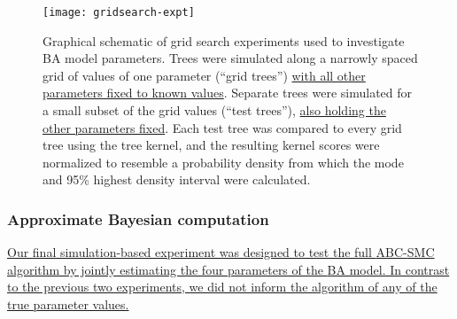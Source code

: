 
\begin{figure}[ht]
  \centering
  \texttt{[image: gridsearch-expt]}
  \caption[Schematic of grid search experiment.]{
    Graphical schematic of grid search experiments used to investigate \gls{BA}
    model parameters. Trees were simulated along a narrowly spaced grid of
    values of one parameter (``grid trees'') {\color{blue}\uline{with all other
    parameters fixed to known values}}. Separate trees were simulated for a
    small subset of the grid values (``test trees''), {\color{blue}\uline{also
    holding the other parameters fixed}}. Each test tree was
    compared to every grid tree using the tree kernel, and the resulting kernel
    scores were normalized to resemble a probability density from which the
    mode and 95\% highest density interval were calculated.
  }
  \label{fig:gridexpt}
\end{figure}

\subsubsection*{Approximate Bayesian computation}

{\color{blue}\uline{
Our final simulation-based experiment was designed to test the full
\gls{ABC}-\gls{SMC} algorithm by jointly estimating the four parameters of the
\gls{BA} model. In contrast to the previous two experiments, we did not inform
the algorithm of any of the true parameter values.
}}


